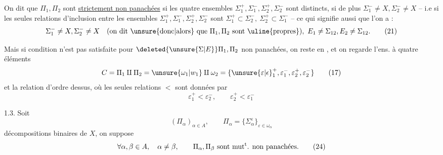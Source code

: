 \noindent\makebox[0pt][r]{\rule[-9ex]{.4pt}{10.5ex}\hspace{.55em}}\uline{} On dit que $\Pi_1,\Pi_2$ sont \uline{strictement non panachées}  si les quatre ensembles $\Sigma_1^+,\Sigma_1^-,\Sigma_2^+,\Sigma_2^-$ sont distincts,  si  de plus $\Sigma_1^-\ne X,\Sigma_2^-\ne X$ -- i.e si les seules relations d'inclusion entre les ensembles $\Sigma_1^+,\Sigma_1^-,\Sigma_2^+,\Sigma_2^-$ sont $\Sigma_1^+\subset\Sigma_2^-,\ \Sigma_2^+\subset\Sigma_1^-$ -- ce qui signifie aussi que l'on a :
\[
\Sigma_1^-\ne X,\Sigma_2^-\ne X
\quad(\text{on dit \unsure{donc|alors} que }\Pi_1,\Pi_2\text{ sont \uline{propres}}),
\ E_1\ne\Sigma_{12},E_2\ne\Sigma_{12}.
\tag*{(21)}
\]

\endgroup
\clearpage
\begingroup\makeatletter\tagsleft@true\makeatother
Mais si  condition n'est pas satisfaite pour $\deleted{\unsure{\Sigma|E}}\Pi_1,\Pi_2$ non panachées, on reste en , et on regarde l'ens. à quatre éléments
\[
C=\Pi_1\amalg\Pi_2=\unsure{\omega_1|w_1}\amalg\omega_2
=\{{\unsure{\varepsilon|\epsilon}}_1^+,\varepsilon_1^-,\varepsilon_2^+,\varepsilon_2^-\}
\tag*{(17)}
\]
et la relation d'ordre dessus, où les seules relations $<$ sont données par
\[
\varepsilon_1^+<\varepsilon_2^-,\qquad\varepsilon_2^+<\varepsilon_1^-
\tag*{(22)}
\]

1.3. Soit 
\[
(\Pi_\alpha)_{\alpha\in A},\qquad \Pi_\alpha=\{\Sigma_\alpha^\varepsilon\}_{\varepsilon\in\omega_\alpha}
\tag*{(23)}
\]
    décompositions binaires de $X$, on suppose 
\[
\forall\alpha,\beta\in A,\quad\alpha\ne\beta,\qquad
\Pi_\alpha,\Pi_\beta\ \text{sont mut\textsuperscript{t}. non panachées}.
\tag*{(24)}
\]

